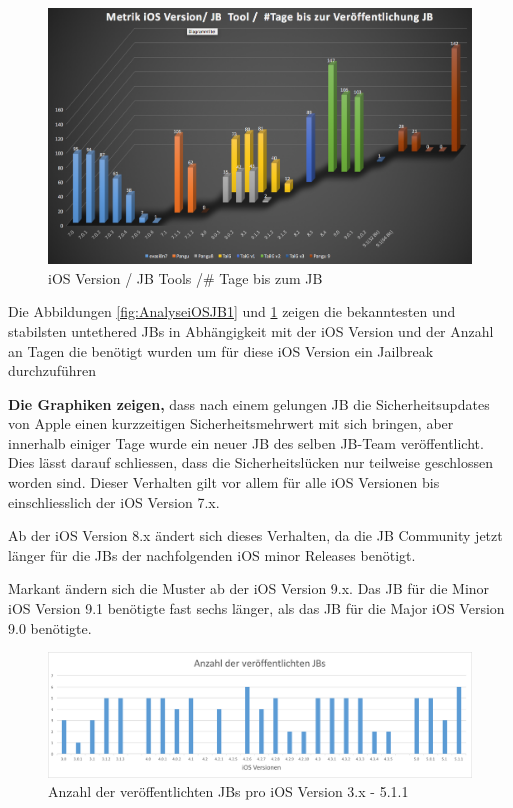 \begin{figure}[htbp]
        \centering
                \includegraphics[scale=0.43]{Bilder/Frage1_2.png}
        \caption{iOS Version / JB Tools /\# Tage bis zum JB}
        \label{fig:AnalyseiOSJB2}
\end{figure}

Die Abbildungen \ref{fig:AnalyseiOSJB1} und \ref{fig:AnalyseiOSJB2} zeigen die bekanntesten und stabilsten untethered JBs in Abhängigkeit mit der iOS Version und der Anzahl an Tagen die benötigt wurden um für diese iOS Version ein Jailbreak durchzuführen \par 
\textbf{Die Graphiken zeigen,} dass nach einem gelungen JB die Sicherheitsupdates von Apple einen kurzzeitigen Sicherheitsmehrwert mit sich bringen, aber innerhalb einiger Tage wurde ein neuer JB des selben JB-Team veröffentlicht. Dies lässt darauf schliessen, dass die Sicherheitslücken nur teilweise geschlossen worden sind. Dieser Verhalten gilt vor allem für alle iOS Versionen bis einschliesslich der iOS Version 7.x.\par  
Ab der iOS Version 8.x ändert sich dieses Verhalten, da die JB Community jetzt länger für die JBs der nachfolgenden iOS minor Releases benötigt. \par 
Markant ändern sich die Muster ab der iOS Version 9.x. Das JB für die Minor iOS Version 9.1 benötigte fast sechs länger, als das JB für die Major iOS Version 9.0 benötigte.\par

\begin{figure}[htbp]
        \centering
                \includegraphics[scale=0.5]{Bilder/iOSJB1.png}
        \caption{Anzahl der veröffentlichten JBs pro iOS Version 3.x - 5.1.1}
        \label{fig:AnalyseAnzahliOSJB1}
\end{figure}

